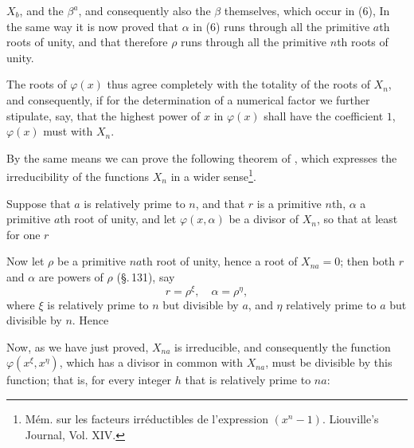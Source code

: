 $X_b$, and the $\beta^a$, and consequently also the $\beta$
themselves, which occur in (6),  In the same way it is now proved that $\alpha$ in (6) runs
through all the primitive $a$th roots of unity, and that therefore $\rho$
runs through all the primitive $n$th roots of unity.

The roots of $\varphi(x)$ thus agree completely with the totality of the
roots of $X_n$, and consequently, if for the determination of a numerical
factor we further stipulate, say, that the highest power of $x$ in
$\varphi(x)$ shall have the coefficient $1$, $\varphi(x)$ must  with $X_n$.


By the same means we can prove the following theorem of
, which expresses the irreducibility of the functions $X_n$
in a wider sense\footnote{Mém. sur les facteurs
irréductibles de l'expression $(x^n - 1)$. Liouville's Journal, Vol. XIV.}.


Suppose that $a$ is relatively prime to $n$, and that $r$ is a primitive
$n$th, $\alpha$ a primitive $a$th root of unity,
and let $\varphi(x,\alpha)$ be a divisor of $X_n$, so that at least for
one $r$


Now let $\rho$ be a primitive $na$th root of unity, hence
a root of $X_{na} = 0$; then both $r$ and $\alpha$ are powers
of $\rho$ (\S.\,131), say
\[
r = \rho^{\xi},\quad \alpha = \rho^{\eta},
\]
where $\xi$ is relatively prime to $n$ but divisible by $a$, and $\eta$
relatively prime to $a$ but divisible by $n$. Hence


Now, as we have just proved, $X_{na}$ is irreducible, and consequently
the function $\varphi(x^{\xi}, x^{\eta})$, which has a divisor in common
with $X_{na}$, must be divisible by this function; that is, for
every integer $h$ that is relatively prime to $na$:


